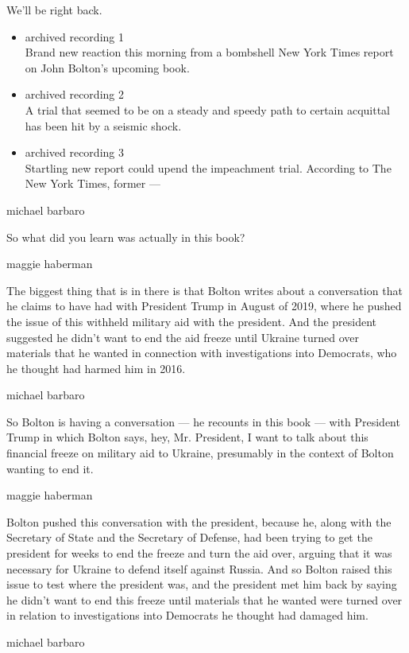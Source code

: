 We'll be right back.

\begin{itemize}
\item
  archived recording 1\\
  Brand new reaction this morning from a bombshell New York Times report
  on John Bolton's upcoming book.
\item
  archived recording 2\\
  A trial that seemed to be on a steady and speedy path to certain
  acquittal has been hit by a seismic shock.
\item
  archived recording 3\\
  Startling new report could upend the impeachment trial. According to
  The New York Times, former ---
\end{itemize}

michael barbaro

So what did you learn was actually in this book?

maggie haberman

The biggest thing that is in there is that Bolton writes about a
conversation that he claims to have had with President Trump in August
of 2019, where he pushed the issue of this withheld military aid with
the president. And the president suggested he didn't want to end the aid
freeze until Ukraine turned over materials that he wanted in connection
with investigations into Democrats, who he thought had harmed him in
2016.

michael barbaro

So Bolton is having a conversation --- he recounts in this book --- with
President Trump in which Bolton says, hey, Mr. President, I want to talk
about this financial freeze on military aid to Ukraine, presumably in
the context of Bolton wanting to end it.

maggie haberman

Bolton pushed this conversation with the president, because he, along
with the Secretary of State and the Secretary of Defense, had been
trying to get the president for weeks to end the freeze and turn the aid
over, arguing that it was necessary for Ukraine to defend itself against
Russia. And so Bolton raised this issue to test where the president was,
and the president met him back by saying he didn't want to end this
freeze until materials that he wanted were turned over in relation to
investigations into Democrats he thought had damaged him.

michael barbaro


